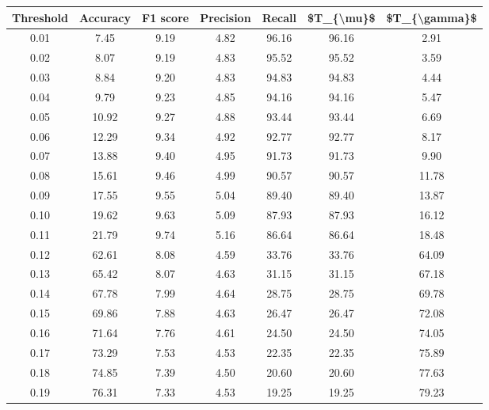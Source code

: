 \begin{tabular}{|c|c|c|c|c|c|c|}
\hline
 Threshold &  Accuracy &  F1 score &  Precision &  Recall &  \$T\_\{\textbackslash mu\}\$ &  \$T\_\{\textbackslash gamma\}\$ \\
\hline
      0.01 &      7.45 &      9.19 &       4.82 &   96.16 &      96.16 &          2.91 \\
      0.02 &      8.07 &      9.19 &       4.83 &   95.52 &      95.52 &          3.59 \\
      0.03 &      8.84 &      9.20 &       4.83 &   94.83 &      94.83 &          4.44 \\
      0.04 &      9.79 &      9.23 &       4.85 &   94.16 &      94.16 &          5.47 \\
      0.05 &     10.92 &      9.27 &       4.88 &   93.44 &      93.44 &          6.69 \\
      0.06 &     12.29 &      9.34 &       4.92 &   92.77 &      92.77 &          8.17 \\
      0.07 &     13.88 &      9.40 &       4.95 &   91.73 &      91.73 &          9.90 \\
      0.08 &     15.61 &      9.46 &       4.99 &   90.57 &      90.57 &         11.78 \\
      0.09 &     17.55 &      9.55 &       5.04 &   89.40 &      89.40 &         13.87 \\
      0.10 &     19.62 &      9.63 &       5.09 &   87.93 &      87.93 &         16.12 \\
      0.11 &     21.79 &      9.74 &       5.16 &   86.64 &      86.64 &         18.48 \\
      0.12 &     62.61 &      8.08 &       4.59 &   33.76 &      33.76 &         64.09 \\
      0.13 &     65.42 &      8.07 &       4.63 &   31.15 &      31.15 &         67.18 \\
      0.14 &     67.78 &      7.99 &       4.64 &   28.75 &      28.75 &         69.78 \\
      0.15 &     69.86 &      7.88 &       4.63 &   26.47 &      26.47 &         72.08 \\
      0.16 &     71.64 &      7.76 &       4.61 &   24.50 &      24.50 &         74.05 \\
      0.17 &     73.29 &      7.53 &       4.53 &   22.35 &      22.35 &         75.89 \\
      0.18 &     74.85 &      7.39 &       4.50 &   20.60 &      20.60 &         77.63 \\
      0.19 &     76.31 &      7.33 &       4.53 &   19.25 &      19.25 &         79.23 \\

\end{tabular}
